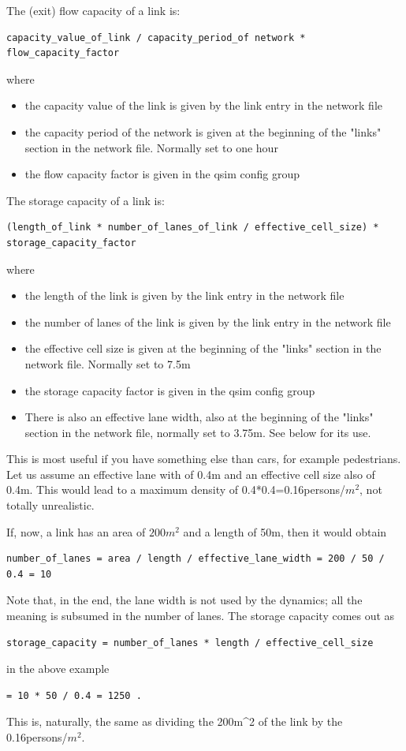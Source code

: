 The (exit) flow capacity of a link is:
\begin{lstlisting}
capacity_value_of_link / capacity_period_of network * flow_capacity_factor
\end{lstlisting}
where
\begin{itemize}
	\item the capacity value of the link is given by the link entry in the network file
	\item the  capacity period of the network is given at the beginning of the "links"  section in the network file. Normally set to one hour
	\item the flow capacity factor is given in the qsim config group
\end{itemize}

The storage capacity of a link is:
\begin{lstlisting}
(length_of_link * number_of_lanes_of_link / effective_cell_size) * storage_capacity_factor
\end{lstlisting}
where
\begin{itemize}
	\item the length of the link is given by the link entry in the network file
	\item the number of lanes of the link is given by the link entry in the network file
	\item the effective cell size is given at the beginning of the "links" section in the network file. Normally set to 7.5m
	\item the storage capacity factor is given in the qsim config group
	\item There  is also an effective lane width, also at the beginning of the "links"  section in the network file, normally set to 3.75m. See below for  its use.
\end{itemize}

This is most useful if you have something else than  cars, for example pedestrians. Let us assume an effective lane  with of 0.4m and an effective cell size also of 0.4m. This would  lead to a maximum density of 0.4*0.4=0.16persons/$m^2$, not totally  unrealistic.

If, now, a link has an area of $200m^2$ and a length of 50m, then it would obtain
\begin{lstlisting}
number_of_lanes = area / length / effective_lane_width = 200 / 50 / 0.4 = 10
\end{lstlisting}

Note that, in the end, the lane width is not used by the  dynamics; all the meaning is subsumed in the number of lanes. The  storage capacity comes out as
\begin{lstlisting}
storage_capacity = number_of_lanes * length / effective_cell_size
\end{lstlisting}
in the above example
\begin{lstlisting}
= 10 * 50 / 0.4 = 1250 .
\end{lstlisting}
This is, naturally, the same as dividing the 200m\textasciicircum2 of the link by the 0.16persons/$m^2$.

